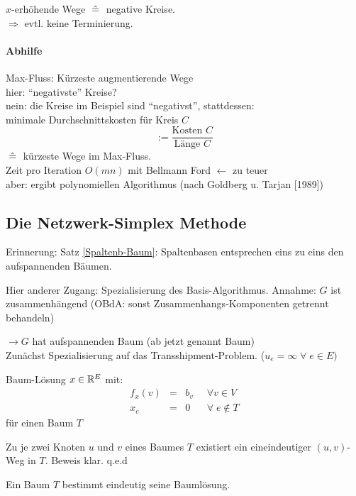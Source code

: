 $x$-erhöhende Wege $\; \hat{=}\;$ negative Kreise.\\
$\Rightarrow$ evtl. keine Terminierung.

\paragraph{Abhilfe} Max-Fluss: Kürzeste augmentierende Wege\\
hier: "`negativste"' Kreise?\\
nein: die Kreise im Beispiel sind "`negativst"', stattdessen:\\
minimale Durchschnittskosten für Kreis $C$
\[ := \frac{\mbox{Kosten }C}{\mbox{Länge }C}\]
$\; \hat{=}\;$ kürzeste Wege im Max-Fluss.\\
Zeit pro Iteration $O(m n)$ mit Bellmann Ford $\leftarrow$ zu teuer\\
aber: ergibt polynomiellen Algorithmus (nach Goldberg u. Tarjan [1989])

\subsection{Die Netzwerk-Simplex Methode}

Erinnerung: Satz \ref{Spaltenb-Baum}: Spaltenbasen entsprechen eins zu eins
den aufspannenden Bäumen.

Hier anderer Zugang: Spezialisierung des Basis-Algorithmus.
Annahme: $G$ ist zusammenhängend (OBdA: sonst Zusammenhangs-Komponenten 
getrennt behandeln)

$\rightarrow G$ hat aufspannenden Baum (ab jetzt genannt Baum)\\
Zunächst Spezialisierung auf das Transshipment-Problem. ($u_{e} = \infty \;
\forall \; e \in E)$

Baum-Lösung $x \in \mathbb{R}^{E}$ mit:
\[\begin{array}{rcll} f_{x}(v) &= &b_{v} &\; \; \forall v \in V\\
x_{e}&=&0 &\; \; \forall \; e \not\in T \end{array}\]
für einen Baum $T$

\begin{lemma}
Zu je zwei Knoten $u$ und $v$ eines Baumes $T$ existiert ein eineindeutiger
$(u,v)$-Weg in $T$. Beweis klar. q.e.d
\end{lemma}

\begin{lemma}
Ein Baum $T$ bestimmt eindeutig seine Baumlösung.
\end{lemma}

